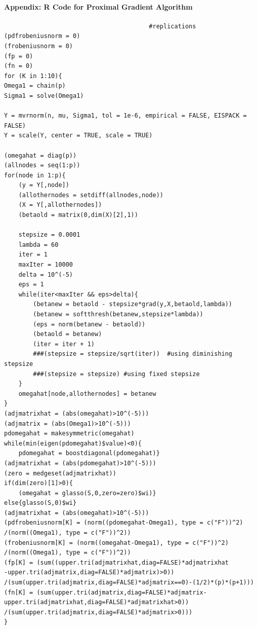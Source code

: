 \documentclass[12pt, leqno]{article}
\begin{document}
\paragraph{Appendix: R Code for Proximal Gradient Algorithm}
\begin{verbatim}
                                        #replications
(pdfrobeniusnorm = 0)
(frobeniusnorm = 0)
(fp = 0)
(fn = 0)
for (K in 1:10){
Omega1 = chain(p)
Sigma1 = solve(Omega1)

Y = mvrnorm(n, mu, Sigma1, tol = 1e-6, empirical = FALSE, EISPACK = FALSE)
Y = scale(Y, center = TRUE, scale = TRUE)

(omegahat = diag(p))
(allnodes = seq(1:p))
for(node in 1:p){
    (y = Y[,node])
    (allothernodes = setdiff(allnodes,node))
    (X = Y[,allothernodes])
    (betaold = matrix(0,dim(X)[2],1))
    
    stepsize = 0.0001
    lambda = 60
    iter = 1
    maxIter = 10000
    delta = 10^(-5)
    eps = 1
    while(iter<maxIter && eps>delta){
        (betanew = betaold - stepsize*grad(y,X,betaold,lambda))
        (betanew = softthresh(betanew,stepsize*lambda))
        (eps = norm(betanew - betaold))
        (betaold = betanew)
        (iter = iter + 1)
        ###(stepsize = stepsize/sqrt(iter))  #using diminishing stepsize
        ###(stepsize = stepsize) #using fixed stepsize
    }
    omegahat[node,allothernodes] = betanew
}
(adjmatrixhat = (abs(omegahat)>10^(-5)))
(adjmatrix = (abs(Omega1)>10^(-5)))
pdomegahat = makesymmetric(omegahat)
while(min(eigen(pdomegahat)$value)<0){
    pdomegahat = boostdiagonal(pdomegahat)}
(adjmatrixhat = (abs(pdomegahat)>10^(-5)))
(zero = medgeset(adjmatrixhat))
if(dim(zero)[1]>0){
    (omegahat = glasso(S,0,zero=zero)$wi)}
else{glasso(S,0)$wi}
(adjmatrixhat = (abs(omegahat)>10^(-5)))
(pdfrobeniusnorm[K] = (norm((pdomegahat-Omega1), type = c("F"))^2)
/(norm((Omega1), type = c("F"))^2))
(frobeniusnorm[K] = (norm((omegahat-Omega1), type = c("F"))^2)
/(norm((Omega1), type = c("F"))^2))
(fp[K] = (sum((upper.tri(adjmatrixhat,diag=FALSE)*adjmatrixhat
-upper.tri(adjmatrix,diag=FALSE)*adjmatrix)>0))
/(sum(upper.tri(adjmatrix,diag=FALSE)*adjmatrix==0)-(1/2)*(p)*(p+1)))
(fn[K] = (sum(upper.tri(adjmatrix,diag=FALSE)*adjmatrix-
upper.tri(adjmatrixhat,diag=FALSE)*adjmatrixhat>0))
/(sum(upper.tri(adjmatrix,diag=FALSE)*adjmatrix>0)))     
}
\end{verbatim}
\end{document}
